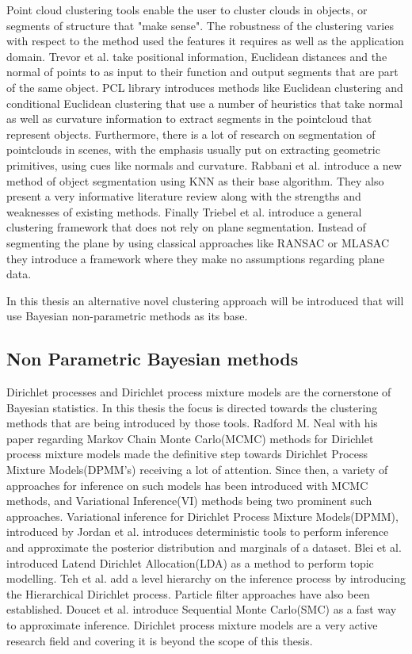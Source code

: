 \documentclass[twoside,hidelinks]{article}
\begin{document}
Point cloud clustering tools enable the user to cluster clouds in objects, or segments of structure that "make sense". The robustness of the clustering varies with respect to the method used the features it requires as well as the application domain.
Trevor et al.\cite{pointSeg} take positional information, Euclidean distances and the normal of points to as input to their function and output segments that are part of the same object. PCL library\cite{pcl} introduces methods like Euclidean clustering and conditional Euclidean clustering that use a number of heuristics that take normal as well as curvature information to extract segments in the pointcloud that represent objects. Furthermore, there is a lot of research on segmentation of pointclouds in scenes, with the emphasis usually put on extracting geometric primitives\cite{planarSeg},\cite{planarSeg2} using cues like normals and curvature. Rabbani et al.\cite{segOverview} introduce a new method of object segmentation using KNN as their base algorithm. They also present a very informative literature review along with the strengths and weaknesses of existing methods. Finally Triebel et al.\cite{smartSeg} introduce a general clustering framework that does not rely on plane segmentation. Instead of segmenting the plane by using classical approaches like RANSAC or MLASAC they introduce a framework where they make no assumptions regarding plane data. 
 
In this thesis an alternative novel clustering approach will be introduced that will use Bayesian non-parametric methods as its base.

\subsection{Non Parametric Bayesian methods}

Dirichlet processes and Dirichlet process mixture models are the cornerstone of Bayesian statistics. In this thesis the focus is directed towards the clustering methods that are being introduced by those tools. Radford M. Neal\cite{bayes:neal} with his paper regarding Markov Chain Monte Carlo(MCMC) methods for Dirichlet process mixture models made the definitive step towards Dirichlet Process Mixture Models(DPMM's) receiving a lot of attention. Since then, a variety of approaches for inference on such models has been introduced with MCMC methods, and Variational Inference(VI) methods being two prominent such approaches. Variational inference for Dirichlet Process Mixture Models(DPMM), introduced by Jordan et al.\cite{bayes:jordan} introduces deterministic tools to perform inference and approximate the posterior distribution and marginals of a dataset. Blei et al.\cite{LDA} introduced Latend Dirichlet Allocation(LDA) as a method to perform topic modelling. Teh et al.\cite{bayes:hier} add a level hierarchy on the inference process by introducing the Hierarchical Dirichlet process. Particle filter approaches have also been established. Doucet et al.\cite{bayes:smc} introduce Sequential Monte Carlo(SMC) as a fast way to approximate inference. Dirichlet process mixture models are a very active research field and covering it is beyond the scope of this thesis. 
\end{document}

